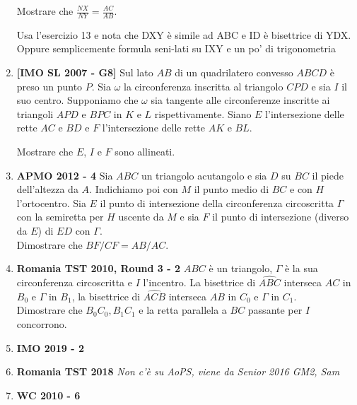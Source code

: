 \begin{enumerate}
	Mostrare che $\displaystyle\frac{NX}{NY}=\displaystyle\frac{AC}{AB}$.
	
	\begin{sol}Usa l'esercizio 13 e nota che DXY è simile ad ABC e ID è bisettrice di YDX. Oppure semplicemente formula seni-lati su IXY e un po' di trigonometria
	\end{sol}
	
	\item \textbf{[IMO SL 2007 - G8]}
	Sul lato $AB$ di un quadrilatero convesso $ABCD$ è preso un punto $P$. Sia $\omega$ la circonferenza inscritta al triangolo $CPD$ e sia $I$ il suo centro. Supponiamo che $\omega$ sia tangente alle circonferenze inscritte ai triangoli $APD$ e $BPC$ in $K$ e $L$ rispettivamente. Siano $E$ l'intersezione delle rette $AC$ e $BD$ e $F$ l'intersezione delle rette $AK$ e $BL$.
	
	Mostrare che $E$, $I$ e $F$ sono allineati.
	
	\item \textbf{APMO 2012 - 4} Sia $ ABC $ un triangolo acutangolo e sia $ D $ su $BC$ il piede dell'altezza da $ A $. Indichiamo poi con $M$ il punto medio di $BC$ e con $H$ l'ortocentro. Sia $E$ il punto di intersezione della circonferenza circoscritta $\Gamma$ con la semiretta per $H$ uscente da $M$ e sia $F$ il punto di intersezione (diverso da $E$) di $ED$ con $\Gamma$.\\
	Dimostrare che $BF/CF=AB/AC$.
	
	\item \textbf{Romania TST 2010, Round 3 - 2} $ABC$ è un triangolo, $\Gamma$ è la sua circonferenza circoscritta e $I$ l'incentro. La bisettrice di $\widehat{ABC}$ interseca $AC$ in $B_0$ e $\Gamma$ in $B_1$, la bisettrice di $\widehat{ACB}$ interseca $AB$ in $C_0$ e $\Gamma$ in $C_1$. \\
	Dimostrare che $B_0C_0,B_1C_1$ e la retta parallela a $BC$ passante per $I$ concorrono.
	
	\item \textbf{IMO 2019 - 2}
	\item \textbf{Romania TST 2018} \emph{Non c'è su AoPS, viene da Senior 2016 GM2, Sam}
	\item \textbf{WC 2010 - 6} 

\end{enumerate}
